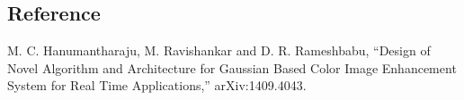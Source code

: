 \documentclass[10pt,twocolumn,letterpaper]{article}
\begin{document}
\subsection{Reference}
M. C. Hanumantharaju, M. Ravishankar and D. R. Rameshbabu,
``Design of Novel Algorithm and Architecture for Gaussian Based Color Image Enhancement System for Real Time Applications,'' arXiv:1409.4043.

{\small


}
\end{document}

